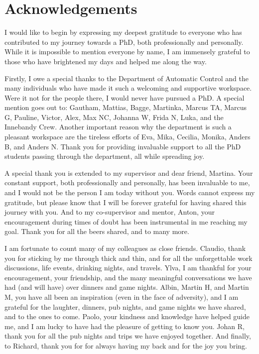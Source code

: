 \chapter*{Acknowledgements}
I would like to begin by expressing my deepest gratitude to everyone who has contributed to my journey towards a PhD, both professionally and personally.
While it is impossible to mention everyone by name, I am immensely grateful to those who have brightened my days and helped me along the way.

Firstly, I owe a special thanks to the Department of Automatic Control and the many individuals who have made it such a welcoming and supportive workspace.
Were it not for the people there, I would never have pursued a PhD.
A special mention goes out to: Gautham, Mattias, Bagge, Martinka, Marcus TA, Marcus G, Pauline, Victor, Alex, Max NC, Johanna W, Frida N, Luka, and the Innebandy Crew.
Another important reason why the department is such a pleasant workspace are the tireless efforts of Eva, Mika, Cecilia, Monika, Anders B, and Anders N.
Thank you for providing invaluable support to all the PhD students passing through the department, all while spreading joy.

A special thank you is extended to my supervisor and dear friend, Martina.
Your constant support, both professionally and personally, has been invaluable to me, and I would not be the person I am today without you.
Words cannot express my gratitude, but please know that I will be forever grateful for having shared this journey with you.
And to my co-supervisor and mentor, Anton, your encouragement during times of doubt has been instrumental in me reaching my goal.
Thank you for all the beers shared, and to many more.

I am fortunate to count many of my colleagues as close friends.
Claudio, thank you for sticking by me through thick and thin, and for all the unforgettable work discussions, life events, drinking nights, and travels.
Ylva, I am thankful for your encouragement, your friendship, and the many meaningful conversations we have had (and will have) over dinners and game nights.
Albin, Martin H, and Martin M, you have all been an inspiration (even in the face of adversity), and I am grateful for the laughter, dinners, pub nights, and game nights we have shared, and to the ones to come.
Paolo, your kindness and knowledge have helped guide me, and I am lucky to have had the pleasure of getting to know you.
Johan R, thank you for all the pub nights and trips we have enjoyed together.
And finally, to Richard, thank you for for always having my back and for the joy you bring.

